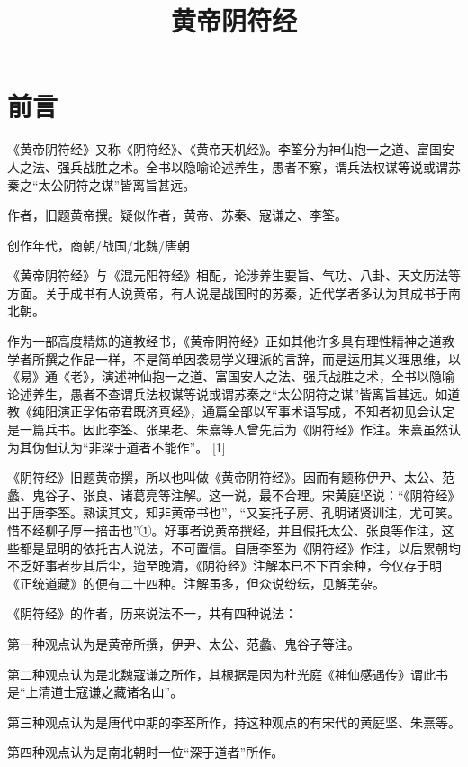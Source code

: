 \documentclass[12pt,UTF8]{ctexbook}
\title{\heiti\zihao{0} 黄帝阴符经}
\author{}
\date{}
\begin{document}
\maketitle
\tableofcontents

\frontmatter
\chapter{前言}

《黄帝阴符经》又称《阴符经》、《黄帝天机经》。李筌分为神仙抱一之道、富国安人之法、强兵战胜之术。全书以隐喻论述养生，愚者不察，谓兵法权谋等说或谓苏秦之“太公阴符之谋”皆离旨甚远。

作者，旧题黄帝撰。疑似作者，黄帝、苏秦、寇谦之、李筌。

创作年代，商朝/战国/北魏/唐朝

《黄帝阴符经》与《混元阳符经》相配，论涉养生要旨、气功、八卦、天文历法等方面。关于成书有人说黄帝，有人说是战国时的苏秦，近代学者多认为其成书于南北朝。

作为一部高度精炼的道教经书，《黄帝阴符经》正如其他许多具有理性精神之道教学者所撰之作品一样，不是简单因袭易学义理派的言辞，而是运用其义理思维，以《易》通《老》，演述神仙抱一之道、富国安人之法、强兵战胜之术，全书以隐喻论述养生，愚者不查谓兵法权谋等说或谓苏秦之“太公阴符之谋”皆离旨甚远。如道教《纯阳演正孚佑帝君既济真经》，通篇全部以军事术语写成，不知者初见会认定是一篇兵书。因此李筌、张果老、朱熹等人曾先后为《阴符经》作注。朱熹虽然认为其伪但认为“非深于道者不能作”。 [1]

《阴符经》旧题黄帝撰，所以也叫做《黄帝阴符经》。因而有题称伊尹、太公、范蠡、鬼谷子、张良、诸葛亮等注解。这一说，最不合理。宋黄庭坚说：“《阴符经》出于唐李筌。熟读其文，知非黄帝书也”，“又妄托子房、孔明诸贤训注，尤可笑。惜不经柳子厚一掊击也”①。好事者说黄帝撰经，并且假托太公、张良等作注，这些都是显明的依托古人说法，不可置信。自唐李筌为《阴符经》作注，以后累朝均不乏好事者步其后尘，迨至晚清，《阴符经》注解本已不下百余种，今仅存于明《正统道藏》的便有二十四种。注解虽多，但众说纷纭，见解芜杂。

《阴符经》的作者，历来说法不一，共有四种说法：

第一种观点认为是黄帝所撰，伊尹、太公、范蠡、鬼谷子等注。

第二种观点认为是北魏寇谦之所作，其根据是因为杜光庭《神仙感遇传》谓此书是“上清道士寇谦之藏诸名山”。

第三种观点认为是唐代中期的李荃所作，持这种观点的有宋代的黄庭坚、朱熹等。

第四种观点认为是南北朝时一位“深于道者”所作。
\end{document}
